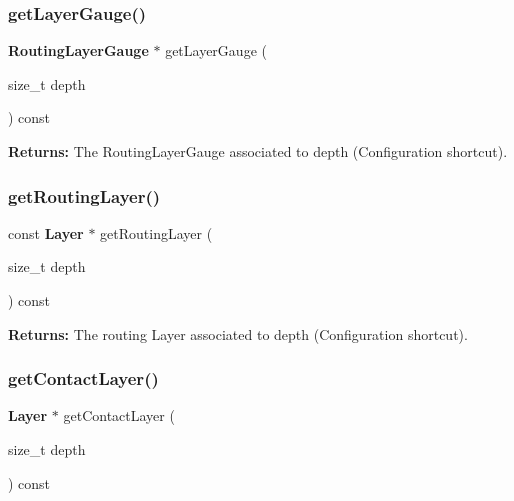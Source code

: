 \subsubsection{\texorpdfstring{get\+Layer\+Gauge()}{getLayerGauge()}}
{\footnotesize\ttfamily \textbf{ Routing\+Layer\+Gauge} $\ast$ get\+Layer\+Gauge (\begin{DoxyParamCaption}\item[{size\+\_\+t}]{depth }\end{DoxyParamCaption}) const\hspace{0.3cm}{\ttfamily [inline]}}

{\bfseries Returns\+:} The Routing\+Layer\+Gauge associated to {\ttfamily depth} (Configuration shortcut). \mbox{\label{classKatabatic_1_1KatabaticEngine_afa7ea850397e87889733ac959833b49f}} 
\subsubsection{\texorpdfstring{get\+Routing\+Layer()}{getRoutingLayer()}}
{\footnotesize\ttfamily const \textbf{ Layer} $\ast$ get\+Routing\+Layer (\begin{DoxyParamCaption}\item[{size\+\_\+t}]{depth }\end{DoxyParamCaption}) const\hspace{0.3cm}{\ttfamily [inline]}}

{\bfseries Returns\+:} The routing Layer associated to {\ttfamily depth} (Configuration shortcut). \mbox{\label{classKatabatic_1_1KatabaticEngine_a4c4549515aef37e81f2cc6537b931edc}} 
\subsubsection{\texorpdfstring{get\+Contact\+Layer()}{getContactLayer()}}
{\footnotesize\ttfamily \textbf{ Layer} $\ast$ get\+Contact\+Layer (\begin{DoxyParamCaption}\item[{size\+\_\+t}]{depth }\end{DoxyParamCaption}) const\hspace{0.3cm}{\ttfamily [inline]}}


